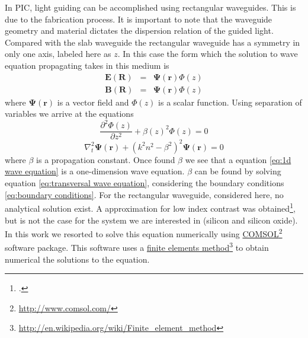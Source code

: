 \documentclass[12pt,twoside,english]{book}
\renewcommand{\~}{\perispomeni}%
\numberwithin{equation}{section}
\numberwithin{figure}{section}
\newcommand\fnurl[2]{%
 \href{#2}{#1}\footnote{\url{#2}}%
}
\begin{document}
In PIC, light guiding can be accomplished using rectangular waveguides. This is due to the fabrication process. It is important to note that the waveguide geometry and material dictates the dispersion relation of the guided light. Compared with the slab waveguide the rectangular waveguide has a symmetry in only one axis, labeled here as $z$. In this case the form which the solution to wave equation propagating takes in this medium is
\begin{subequations}
\begin{eqnarray}
\mathbf{E}\left(\mathbf{R}\right) & = & \mathbf{\Psi}\left(\mathbf{r}\right)\Phi\left(z\right)\label{eq:assumption E waveguide}\\
\mathbf{B}\left(\mathbf{R}\right) & = & \mathbf{\Psi}\left(\mathbf{r}\right)\Phi\left(z\right)\label{eq:assumption B waveguide}
\end{eqnarray}
\end{subequations}
where $\mathbf{\Psi}\left(\mathbf{r}\right)$ is a vector field and $\Phi\left(z\right)$ is a scalar function. Using separation of variables we arrive at the equations
\begin{equation}
\frac{\partial^{2}\Phi\left(z\right)}{\partial z^{2}}+\beta\left(z\right)^{2}\Phi\left(z\right)=0
\label{eq:1d wave equation}
\end{equation}
\begin{equation}
\nabla_{t}^{2}\mathbf{\Psi}\left(\mathbf{r}\right)+\left(k^2 n^2 -\beta^2 \right)^{2}\mathbf{\Psi}\left(\mathbf{r}\right)=0
\label{eq:transversal wave equation}
\end{equation}
where $\beta$ is a propagation constant. Once found $\beta$ we see that a equation \ref{eq:1d wave equation} is a one-dimension wave equation. $\beta$ can be found by solving equation \ref{eq:transversal wave equation}, considering the boundary conditions \ref{eq:boundary conditions}. For the rectangular waveguide, considered here, no analytical solution exist. A approximation for low index contrast was obtained\footcite{Marcatili:1969p2589}, but is not the case for the system we are interested in (silicon and silicon oxide). In this work we resorted to solve this equation numerically using \fnurl{COMSOL}{http://www.comsol.com/} software package. This software uses a \fnurl{finite elements method}{http://en.wikipedia.org/wiki/Finite_element_method} to obtain numerical the solutions to the equation.
\end{document}
